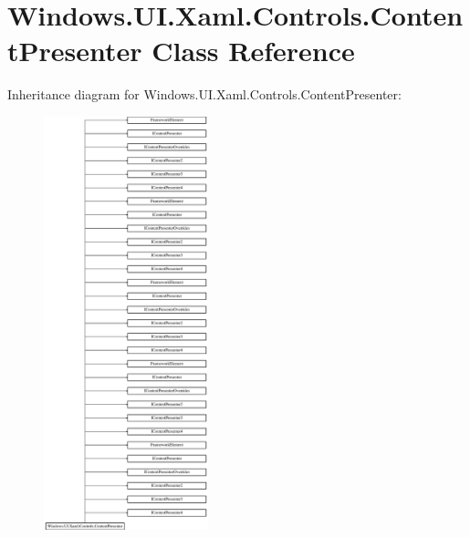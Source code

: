 \hypertarget{class_windows_1_1_u_i_1_1_xaml_1_1_controls_1_1_content_presenter}{}\section{Windows.\+U\+I.\+Xaml.\+Controls.\+Content\+Presenter Class Reference}
\label{class_windows_1_1_u_i_1_1_xaml_1_1_controls_1_1_content_presenter}
Inheritance diagram for Windows.\+U\+I.\+Xaml.\+Controls.\+Content\+Presenter\+:\begin{figure}[H]
\begin{center}
\leavevmode
\includegraphics[height=12.000000cm]{class_windows_1_1_u_i_1_1_xaml_1_1_controls_1_1_content_presenter}
\end{center}
\end{figure}
